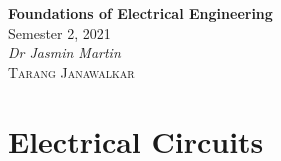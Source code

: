 \documentclass{article}
\date{}
\newcommand{\className}{Foundations of Electrical Engineering}
\newcommand{\classTime}{Semester 2, 2021}
\newcommand{\classInstructorName}{Dr Jasmin Martin}
\begin{document}
\begin{titlepage}
    \vspace*{\fill}
    \begin{center}
        \LARGE{\textbf{\className}}
        \texorpdfstring{\\}{ }
        \texorpdfstring{\vspace{0.1in}}{ }
        \normalsize{\classTime}
        \texorpdfstring{\\}{ }
        \texorpdfstring{\vspace{0.1in}}{ }
        \normalsize\textit{\classInstructorName}
        \texorpdfstring{\\}{ }
        \texorpdfstring{\vspace{0.2in}}{ }
        \textsc{Tarang Janawalkar}
    \end{center}
    \vspace*{\fill}
    \doclicenseThis
    \thispagestyle{empty}
\end{titlepage}
\newpage

\tableofcontents
\newpage

\section{Electrical Circuits}
\end{document}

